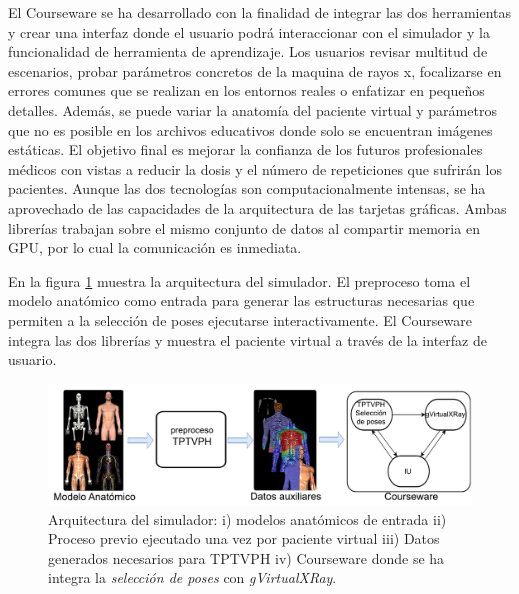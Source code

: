 El \ac{Courseware} se ha desarrollado con la finalidad de integrar las dos herramientas y crear una interfaz donde el usuario podrá interaccionar con el simulador y la funcionalidad de herramienta de aprendizaje.
Los usuarios revisar multitud de escenarios, probar parámetros concretos de la maquina de rayos x, focalizarse en errores comunes que se realizan en los entornos reales o enfatizar en pequeños detalles. Además, se puede variar la anatomía del paciente virtual y parámetros que no es posible en los archivos educativos donde solo se encuentran imágenes estáticas. El objetivo final es mejorar la confianza de los futuros profesionales médicos con vistas a reducir la dosis y el número de repeticiones que sufrirán los pacientes. Aunque las dos tecnologías son computacionalmente intensas, se ha aprovechado de las capacidades de la arquitectura de las tarjetas gráficas. Ambas librerías trabajan sobre el mismo conjunto de datos al compartir memoria en \acs{GPU}, por lo cual la comunicación es inmediata.

En la figura \ref{fig:Posesummary} muestra la arquitectura del simulador. El preproceso toma el modelo anatómico como entrada para generar las estructuras necesarias que permiten a la selección de poses ejecutarse interactivamente. El \ac{Courseware} integra las dos librerías y muestra el paciente virtual a través de la interfaz de usuario.

\begin{figure}[h]
\centering
\includegraphics[width=\linewidth]{IMG/ArquXRAY.pdf}

\caption{\label{fig:Posesummary} Arquitectura del simulador: i) modelos anatómicos de entrada ii) Proceso previo ejecutado una vez por paciente virtual iii) Datos generados necesarios para TPTVPH iv) \ac{Courseware} donde se ha integra la \emph{selección de poses} con \emph{gVirtualXRay}.
}
\end{figure}

